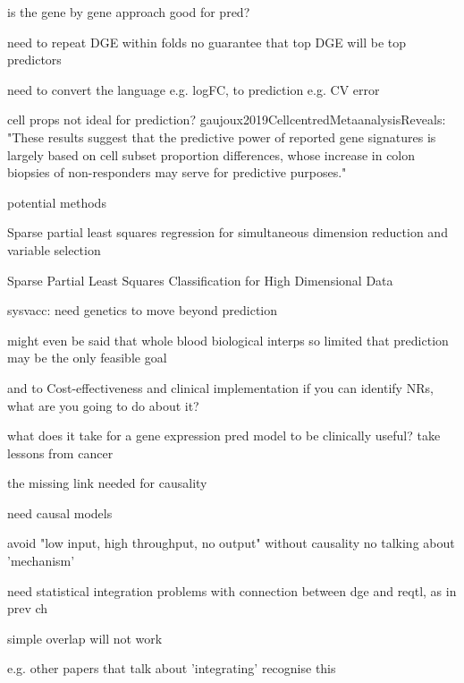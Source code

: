 \begin{outline}
            is the gene by gene approach good for pred?
        
        need to repeat DGE within folds
            no guarantee that top DGE will be top predictors

        need to convert the language e.g. logFC, to prediction e.g. CV error

        cell props not ideal for prediction?
            gaujoux2019CellcentredMetaanalysisReveals: "These results suggest that the predictive power of reported gene signatures is largely based on cell subset proportion differences, whose increase in colon biopsies of non-responders may serve for predictive purposes."


        potential methods

            Sparse partial least squares regression for simultaneous dimension reduction and variable selection

             Sparse Partial Least Squares Classification for High Dimensional Data 

        sysvacc: need genetics to move beyond prediction

    might even be said that whole blood biological interps so limited that prediction may be the only feasible goal

    and to Cost-effectiveness and clinical implementation
        if you can identify NRs, what are you going to do about it?

        what does it take for a gene expression pred model to be clinically useful?
            take lessons from cancer

the missing link needed for causality

    need causal models

        avoid "low input, high throughput, no output"
        without causality no talking about 'mechanism'

    need statistical integration
        problems with connection between dge and reqtl, as in prev ch

        simple overlap will not work

            e.g. other papers that talk about 'integrating' recognise this


\end{outline}
